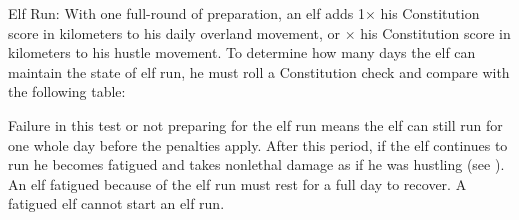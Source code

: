 \begin{itemize*}
    \item Elf Run: With one full-round of preparation, an elf adds 1\onehalf $\times$ his Constitution score in kilometers to his daily overland movement, or \onehalf $\times$ his Constitution score in kilometers to his hustle movement. To determine how many days the elf can maintain the state of elf run, he must roll a Constitution check and compare with the following table:


    Failure in this test or not preparing for the elf run means the elf can still run for one whole day before the penalties apply. After this period, if the elf continues to run he becomes fatigued and takes nonlethal damage as if he was hustling (see ). An elf fatigued because of the elf run must rest for a full day to recover. A fatigued elf cannot start an elf run.


\end{itemize*}
